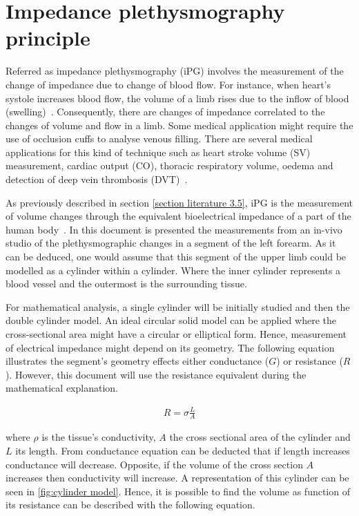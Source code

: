 \section{Impedance plethysmography principle} %
\label{section impedance 3}
Referred as impedance plethysmography (iPG) involves the measurement of the change of impedance due to change of blood flow. For instance, when heart’s systole increases blood flow, the volume of a limb rises due to the inflow of blood (swelling)~\cite{martinsen2011bioimpedance}. Consequently, there are changes of impedance correlated to the changes of volume and flow in a limb. Some medical application might require the use of occlusion cuffs to analyse venous filling. There are several medical applications for this kind of technique such as heart stroke volume (SV) measurement, cardiac output (CO), thoracic respiratory volume, oedema and detection of deep vein thrombosis (DVT)~\cite{holohan1996plethysmography}.

As previously described in section \ref{section literature 3.5}, iPG is the measurement of volume changes through the equivalent bioelectrical impedance of a part of the human body~\cite{corciova2011peripheral}. In this document is presented the measurements from an in-vivo studio of the plethysmographic changes in a segment of the left forearm. As it can be deduced, one would assume that this segment of the upper limb could be modelled as a cylinder within a cylinder. Where the inner cylinder represents a blood vessel and the outermost is the surrounding tissue. 

For mathematical analysis, a single cylinder will be initially studied and then the double cylinder model. An ideal circular solid model can be applied where the cross-sectional area might have a circular or elliptical form. Hence, measurement of electrical impedance might depend on its geometry. The following equation illustrates the segment’s geometry effects either conductance ($G$) or resistance ($R$). However, this document will use the resistance equivalent during the mathematical explanation.

\begin{align}
\label{eq:resistivity}
R=\sigma\frac{L}{A}
\end{align}

where $\rho$ is the tissue’s conductivity, $A$ the cross sectional area of the cylinder and $L$ its length. From conductance equation can be deducted that if length increases conductance will decrease. Opposite, if the volume of the cross section $A$ increases then conductivity will increase. A representation of this cylinder can be seen in \ref{fig:cylinder model}. Hence, it is possible to find the volume as function of its resistance can be described with the following equation.

